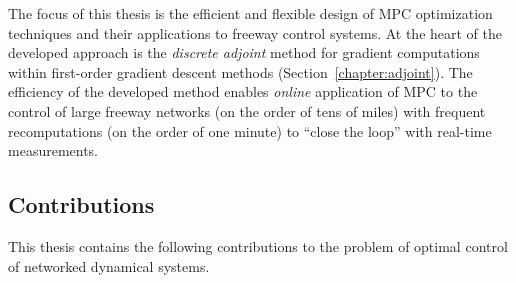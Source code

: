 The focus of this thesis is the efficient and flexible design of MPC optimization techniques and their applications to freeway control systems. At the heart of the developed approach is the \emph{discrete adjoint} method for gradient computations within first-order gradient descent methods (Section~\ref{chapter:adjoint}). The efficiency of the developed method enables \emph{online} application of MPC to the control of large freeway networks (on the order of tens of miles) with frequent recomputations (on the order of one minute) to ``close the loop'' with real-time measurements.

\subsection{Contributions}
\label{sec:contributions}

This thesis contains the following contributions to the problem of optimal control of networked dynamical systems.

